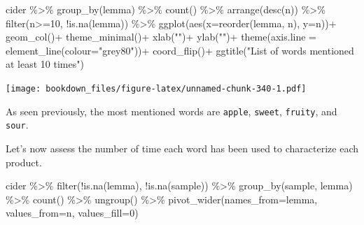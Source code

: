 \documentclass[
]{krantz}
\makeatletter
\newenvironment{Shaded}{\begin{snugshade}}{\end{snugshade}}
\newcommand{\AttributeTok}[1]{\textcolor[rgb]{0.61,0.61,0.61}{#1}}
\newcommand{\DecValTok}[1]{\textcolor[rgb]{0.06,0.06,0.06}{#1}}
\newcommand{\FunctionTok}[1]{\textcolor[rgb]{0,0,0}{#1}}
\newcommand{\NormalTok}[1]{#1}
\newcommand{\SpecialCharTok}[1]{\textcolor[rgb]{0,0,0}{#1}}
\newcommand{\StringTok}[1]{\textcolor[rgb]{0.5,0.5,0.5}{#1}}
\newenvironment{kframe}{%
\medskip{}
\setlength{\fboxsep}{.8em}
 \def\at@end@of@kframe{}%
 \ifinner\ifhmode%
  \def\at@end@of@kframe{\end{minipage}}%
  \begin{minipage}{\columnwidth}%
 \fi\fi%
 \def\FrameCommand##1{\hskip\@totalleftmargin \hskip-\fboxsep
 \colorbox{shadecolor}{##1}\hskip-\fboxsep
     \hskip-\linewidth \hskip-\@totalleftmargin \hskip\columnwidth}%
 \MakeFramed {\advance\hsize-\width
   \@totalleftmargin\z@ \linewidth\hsize
   \@setminipage}}%
 {\par\unskip\endMakeFramed%
 \at@end@of@kframe}
\renewenvironment{Shaded}{\begin{kframe}}{\end{kframe}}
\makeatother
\begin{document}
\begin{Shaded}
\begin{Highlighting}[]
\NormalTok{cider }\SpecialCharTok{\%\textgreater{}\%} 
  \FunctionTok{group\_by}\NormalTok{(lemma) }\SpecialCharTok{\%\textgreater{}\%} 
  \FunctionTok{count}\NormalTok{() }\SpecialCharTok{\%\textgreater{}\%} 
  \FunctionTok{arrange}\NormalTok{(}\FunctionTok{desc}\NormalTok{(n)) }\SpecialCharTok{\%\textgreater{}\%} 
  \FunctionTok{filter}\NormalTok{(n}\SpecialCharTok{\textgreater{}=}\DecValTok{10}\NormalTok{, }\SpecialCharTok{!}\FunctionTok{is.na}\NormalTok{(lemma)) }\SpecialCharTok{\%\textgreater{}\%} 
  \FunctionTok{ggplot}\NormalTok{(}\FunctionTok{aes}\NormalTok{(}\AttributeTok{x=}\FunctionTok{reorder}\NormalTok{(lemma, n), }\AttributeTok{y=}\NormalTok{n))}\SpecialCharTok{+}
  \FunctionTok{geom\_col}\NormalTok{()}\SpecialCharTok{+}
  \FunctionTok{theme\_minimal}\NormalTok{()}\SpecialCharTok{+}
  \FunctionTok{xlab}\NormalTok{(}\StringTok{""}\NormalTok{)}\SpecialCharTok{+}
  \FunctionTok{ylab}\NormalTok{(}\StringTok{""}\NormalTok{)}\SpecialCharTok{+}
  \FunctionTok{theme}\NormalTok{(}\AttributeTok{axis.line =} \FunctionTok{element\_line}\NormalTok{(}\AttributeTok{colour=}\StringTok{"grey80"}\NormalTok{))}\SpecialCharTok{+}
  \FunctionTok{coord\_flip}\NormalTok{()}\SpecialCharTok{+}
  \FunctionTok{ggtitle}\NormalTok{(}\StringTok{"List of words mentioned at least 10 times"}\NormalTok{)}
\end{Highlighting}
\end{Shaded}

\texttt{[image: bookdown\_files/figure-latex/unnamed-chunk-340-1.pdf]}

As seen previously, the most mentioned words are \texttt{apple}, \texttt{sweet}, \texttt{fruity}, and \texttt{sour}.

Let's now assess the number of time each word has been used to characterize each product.

\begin{Shaded}
\begin{Highlighting}[]
\NormalTok{cider }\SpecialCharTok{\%\textgreater{}\%} 
  \FunctionTok{filter}\NormalTok{(}\SpecialCharTok{!}\FunctionTok{is.na}\NormalTok{(lemma), }\SpecialCharTok{!}\FunctionTok{is.na}\NormalTok{(sample)) }\SpecialCharTok{\%\textgreater{}\%} 
  \FunctionTok{group\_by}\NormalTok{(sample, lemma) }\SpecialCharTok{\%\textgreater{}\%} 
  \FunctionTok{count}\NormalTok{() }\SpecialCharTok{\%\textgreater{}\%} 
  \FunctionTok{ungroup}\NormalTok{() }\SpecialCharTok{\%\textgreater{}\%} 
  \FunctionTok{pivot\_wider}\NormalTok{(}\AttributeTok{names\_from=}\NormalTok{lemma, }\AttributeTok{values\_from=}\NormalTok{n, }\AttributeTok{values\_fill=}\DecValTok{0}\NormalTok{)}
\end{Highlighting}
\end{Shaded}
\end{document}
